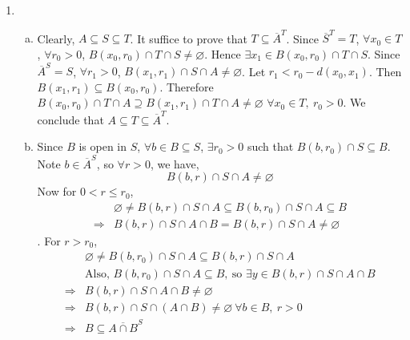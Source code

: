 \documentclass[A4paper,12pt]{article}
\theoremstyle{definition}
\numberwithin{equation}{section}
\begin{document}
\begin{enumerate}[(1)]
        \item
            \begin{enumerate}[(a)]
                \item
                    Clearly, $A \subseteq S \subseteq T$. It suffice to prove that $T \subseteq \overline{A}^T$. 
                    Since $\overline{S}^T = T$, $\forall x_0 \in T$, $\forall r_0>0$, $B(x_0, r_0)\cap T \cap S \neq \varnothing$. 
                    Hence $\exists x_1 \in B(x_0, r_0) \cap T \cap S$.
                    Since $\overline{A}^S  = S$, $\forall r_1 > 0$, $B(x_1, r_1) \cap S \cap A \neq \varnothing$.
                    Let $r_1 < r_0 - d(x_0, x_1)$. Then $B(x_1, r_1) \subseteq B(x_0, r_0)$.
                    Therefore $B(x_0, r_0) \cap T \cap A \supseteq B(x_1, r_1) \cap T \cap A \neq \varnothing$ $\forall x_0 \in T, \: r_0 > 0$.
                    We conclude that $A \subseteq T \subseteq \overline{A}^T$.
                \item
                    Since $B$ is open in $S$, $\forall b \in B \subseteq S$, $\exists r_0 > 0$ such that $B(b, r_0)\cap S \subseteq B$.
                    Note $b \in \overline{A}^S$, so $\forall r>0$, we have, 
                    $$
                    B(b, r)\cap S \cap A \neq \varnothing
                    $$
                    Now for $0<r \le r_0$,
                    \begin{align*}
                        &\varnothing \neq B(b, r) \cap S \cap A \subseteq B(b,r_0)\cap  S \cap A \subseteq B \\
                        \Rightarrow &B(b, r) \cap S \cap A \cap B = B(b, r) \cap S \cap A \neq \varnothing
                    \end{align*}
                    . For $r>r_0$, 
                    \begin{align*}
                        &\varnothing \neq B(b, r_0) \cap S \cap A \subseteq B(b, r) \cap S \cap A \\
                        &\text{Also, } B(b, r_0) \cap S \cap A \subseteq B,\: \text{so }  \exists y \in B(b, r) \cap S \cap A \cap B\\
                        \Rightarrow &B(b, r)\cap S \cap A \cap B \neq \varnothing \\
                        \Rightarrow &B(b, r) \cap S \cap (A \cap B) \neq \varnothing \: \forall b \in B ,\: r>0 \\
                        \Rightarrow & B \subseteq \overline{A\cap B}^S
                    \end{align*}
                   

\end{enumerate}
\end{enumerate}
\end{document}
